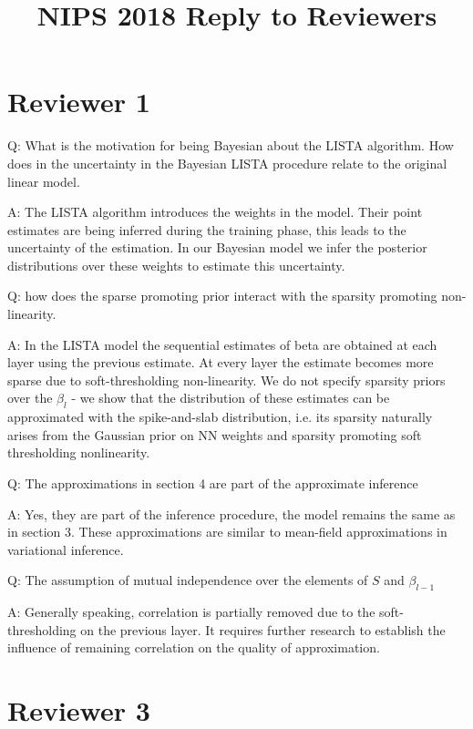 \documentclass{article}
\begin{document}
\title{NIPS 2018 Reply to Reviewers}
\date{}
\maketitle

\section*{Reviewer 1}
Q: What is the motivation for being Bayesian about the LISTA algorithm. How does in the uncertainty in the Bayesian LISTA procedure relate to the original linear model.

A: The LISTA algorithm introduces the weights in the model. Their point estimates are being inferred during the training phase, this leads to the uncertainty of the estimation. In our Bayesian model we infer the posterior distributions over these weights to estimate this uncertainty.
\newline
\newline

Q: how does the sparse promoting prior interact with the sparsity promoting non-linearity.

A: In the LISTA model the sequential estimates of beta are obtained at each layer using the previous estimate. At every layer the estimate becomes more sparse due to soft-thresholding non-linearity. We do not specify sparsity priors over the $\beta_l$ - we show that the distribution of these estimates can be approximated with the spike-and-slab distribution, i.e. its sparsity naturally arises from the Gaussian prior on NN weights and sparsity promoting soft thresholding nonlinearity.
\newline
\newline

Q: The approximations in section 4 are part of the approximate inference

A: Yes, they are part of the inference procedure, the model remains the same as in section 3. These approximations are similar to mean-field approximations in variational inference.
\newline
\newline

Q: The assumption of mutual independence over the elements of $S$ and $\beta_{l-1}$

A: Generally speaking, correlation is partially removed due to the soft-thresholding on the previous layer. It requires further research to establish the influence of remaining correlation on the quality of approximation.
\newline
\newline

\section*{Reviewer 3}
\end{document}
